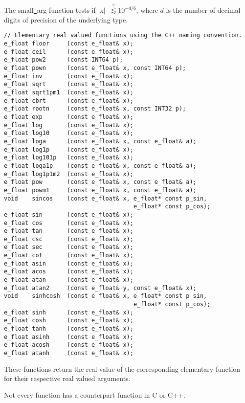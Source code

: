  The {\courier small\underline\ arg} function
tests if $|${\courier x}$|$~$\stackrel{?}{\lesssim} 10^{-d/6}$, where
$d$ is the number of decimal digits of precision of the underlying type.

\begin{lstlisting}
// Elementary real valued functions using the C++ naming convention.
e_float floor     (const e_float& x);
e_float ceil      (const e_float& x);
e_float pow2      (const INT64 p);
e_float pown      (const e_float& x, const INT64 p);
e_float inv       (const e_float& x);
e_float sqrt      (const e_float& x);
e_float sqrt1pm1  (const e_float& x);
e_float cbrt      (const e_float& x);
e_float rootn     (const e_float& x, const INT32 p);
e_float exp       (const e_float& x);
e_float log       (const e_float& x);
e_float log10     (const e_float& x);
e_float loga      (const e_float& x, const e_float& a);
e_float log1p     (const e_float& x);
e_float log101p   (const e_float& x);
e_float loga1p    (const e_float& x, const e_float& a);
e_float log1p1m2  (const e_float& x);
e_float pow       (const e_float& x, const e_float& a);
e_float powm1     (const e_float& x, const e_float& a);
void    sincos    (const e_float& x, e_float* const p_sin,
                                     e_float* const p_cos);
e_float sin       (const e_float& x);
e_float cos       (const e_float& x);
e_float tan       (const e_float& x);
e_float csc       (const e_float& x);
e_float sec       (const e_float& x);
e_float cot       (const e_float& x);
e_float asin      (const e_float& x);
e_float acos      (const e_float& x);
e_float atan      (const e_float& x);
e_float atan2     (const e_float& y, const e_float& x);
void    sinhcosh  (const e_float& x, e_float* const p_sin,
                                     e_float* const p_cos);
e_float sinh      (const e_float& x);
e_float cosh      (const e_float& x);
e_float tanh      (const e_float& x);
e_float asinh     (const e_float& x);
e_float acosh     (const e_float& x);
e_float atanh     (const e_float& x);
\end{lstlisting}

\vspace{6.0pt}

 These functions return the real value of the corresponding
elementary function for their respective real valued arguments.

\vspace{6.0pt}

 Not every function has a counterpart function in C or C++.

